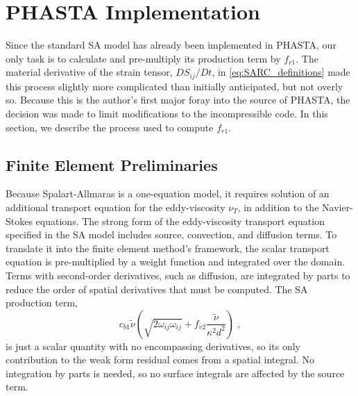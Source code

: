 \documentclass[11pt]{article}
\begin{document}
\section{PHASTA Implementation} %

Since the standard SA model has already been implemented in PHASTA, our only task is to calculate and pre-multiply its production term by $f_{r1}$. The material derivative of the strain tensor, $DS_{ij}/Dt$, in \eqref{eq:SARC_definitions} made this process slightly more complicated than initially anticipated, but not overly so. Because this is the author's first major foray into the source of PHASTA, the decision was made to limit modifications to the incompressible code. In this section, we describe the process used to compute $f_{r1}$.

\subsection{Finite Element Preliminaries}

Because Spalart-Allmaras is a one-equation model, it requires solution of an additional transport equation for the eddy-viscosity $\nu_T$, in addition to the Navier-Stokes equations. The strong form of the eddy-viscosity transport equation specified in the SA model includes source, convection, and diffusion terms. To translate it into the finite element method's framework, the scalar transport equation is pre-multiplied by a weight function and integrated over the domain. Terms with second-order derivatives, such as diffusion, are integrated by parts to reduce the order of spatial derivatives that must be computed. The SA production term,
\begin{equation}
c_{b1}
\tilde{\nu}
\left( \sqrt{2 \omega_{ij} \omega_{ij}} + f_{v2} \frac{\tilde{\nu}}{\kappa^2 d^2} \right)
\;,
\end{equation}
is just a scalar quantity with no encompassing derivatives, so its only contribution to the weak form residual comes from a spatial integral. No integration by parts is needed, so no surface integrals are affected by the source term.
\end{document}
